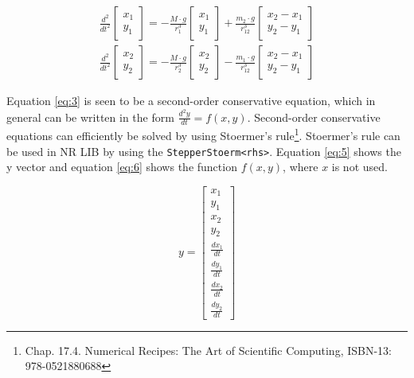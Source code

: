 \begin{equation}
\begin{align*}
\frac { { d }^{ 2 } }{ { dt }^{ 2 } } \left[ \begin{matrix} x_{ 1 } \\ y_{ 1 } \end{matrix} \right] =-\frac { M\cdot g }{ { r }^{ 3 }_{ 1 } } \left[ \begin{matrix} x_{ 1 } \\ y_{ 1 } \end{matrix} \right] +\frac { m_{ 2 }\cdot g }{ { r }^{ 3 }_{ 12 } } \left[ \begin{matrix} x_{ 2 }-x_{ 1 } \\ y_{ 2 }-y_{ 1 } \end{matrix} \right] \\ 
\frac { { d }^{ 2 } }{ { dt }^{ 2 } } \left[ \begin{matrix} x_{ 2 } \\ y_{ 2 } \end{matrix} \right] =-\frac { M\cdot g }{ { r }^{ 3 }_{ 2 } } \left[ \begin{matrix} x_{ 2 } \\ y_{ 2 } \end{matrix} \right] -\frac { m_{ 1 }\cdot g }{ { r }^{ 3 }_{ 12 } } \left[ \begin{matrix} x_{ 2 }-x_{ 1 } \\ y_{ 2 }-y_{ 1 } \end{matrix} \right] 
\end{align*}
\label{eq:3}
\end{equation}

Equation \ref{eq:3} is seen to be a second-order conservative equation, which in general can be written in the form $\frac { d^2y }{ dt } = f(x,y)$. Second-order conservative equations can efficiently be solved by using Stoermer’s rule\footnote{Chap. 17.4. Numerical Recipes: The Art of Scientific Computing, ISBN-13: 978-0521880688}. 
Stoermer’s rule can be used in NR LIB by using the \texttt{StepperStoerm<rhs>}. 
Equation \ref{eq:5} shows the y vector and equation \ref{eq:6} shows the function $f(x,y)$, where $x$ is not used.

\begin{equation}
y=\left[ \begin{matrix} x_1\\ y_1\\ x_2\\ y_2\\ \frac { dx_1 }{ dt } \\ \frac { dy_1}{ dt } \\ \frac { dx_2}{ dt } \\ \frac { dy_2 }{ dt } \end{matrix}  \right]
\label{eq:5}
\end{equation}


